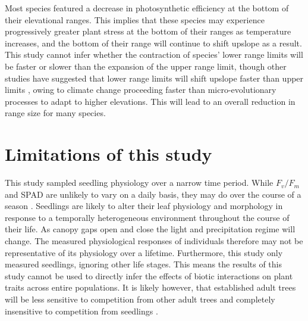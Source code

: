 \documentclass[a4paper, 11pt]{article}
\begin{document}
Most species featured a decrease in photosynthetic efficiency at the bottom of their elevational ranges. This implies that these species may experience progressively greater plant stress at the bottom of their ranges as temperature increases, and the bottom of their range will continue to shift upslope as a result. This study cannot infer whether the contraction of species' lower range limits will be faster or slower than the expansion of the upper range limit, though other studies have suggested that lower range limits will shift upslope faster than upper limits \citep{Campbell2007}, owing to climate change proceeding faster than micro-evolutionary processes to adapt to higher elevations. This will lead to an overall reduction in range size for many species.

\section{Limitations of this study}
This study sampled seedling physiology over a narrow time period. While $F_v/F_m$ and SPAD are unlikely to vary on a daily basis, they may do over the course of a season \citep{Porcar-Castell2008}. Seedlings are likely to alter their leaf physiology and morphology in response to a temporally heterogeneous environment throughout the course of their life. As canopy gaps open and close the light and precipitation regime will change. The measured physiological responses of individuals therefore may not be representative of its physiology over a lifetime. Furthermore, this study only measured seedlings, ignoring other life stages. This means the results of this study cannot be used to directly infer the effects of biotic interactions on plant traits across entire populations. It is likely however, that established adult trees will be less sensitive to competition from other adult trees and completely insensitive to competition from seedlings \citep{Paine2008}. 
\end{document}
